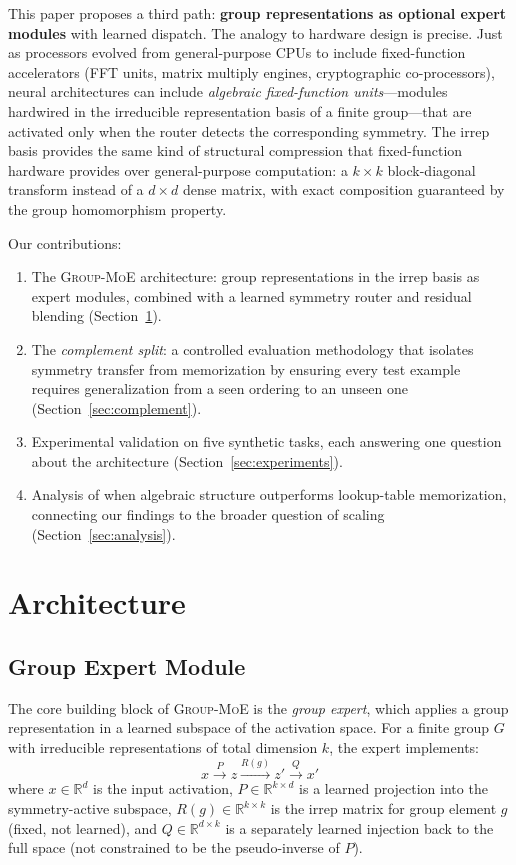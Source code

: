 \documentclass[10pt, letterpaper]{article}
\newcommand{\R}{\mathbb{R}}
\newcommand{\Rg}{R(g)}
\newcommand{\gmoe}{\textsc{Group-MoE}}
\begin{document}
This paper proposes a third path: \textbf{group representations as optional expert modules} with learned dispatch. The analogy to hardware design is precise. Just as processors evolved from general-purpose CPUs to include fixed-function accelerators (FFT units, matrix multiply engines, cryptographic co-processors), neural architectures can include \emph{algebraic fixed-function units}---modules hardwired in the irreducible representation basis of a finite group---that are activated only when the router detects the corresponding symmetry. The irrep basis provides the same kind of structural compression that fixed-function hardware provides over general-purpose computation: a $k \times k$ block-diagonal transform instead of a $d \times d$ dense matrix, with exact composition guaranteed by the group homomorphism property.

Our contributions:
\begin{enumerate}[leftmargin=*]
    \item The \gmoe{} architecture: group representations in the irrep basis as expert modules, combined with a learned symmetry router and residual blending (Section~\ref{sec:arch}).
    \item The \emph{complement split}: a controlled evaluation methodology that isolates symmetry transfer from memorization by ensuring every test example requires generalization from a seen ordering to an unseen one (Section~\ref{sec:complement}).
    \item Experimental validation on five synthetic tasks, each answering one question about the architecture (Section~\ref{sec:experiments}).
    \item Analysis of when algebraic structure outperforms lookup-table memorization, connecting our findings to the broader question of scaling (Section~\ref{sec:analysis}).
\end{enumerate}

\section{Architecture}
\label{sec:arch}

\subsection{Group Expert Module}

The core building block of \gmoe{} is the \emph{group expert}, which applies a group representation in a learned subspace of the activation space. For a finite group $G$ with irreducible representations of total dimension $k$, the expert implements:
\begin{equation}
    x \xrightarrow{P} z \xrightarrow{\Rg} z' \xrightarrow{Q} x'
    \label{eq:expert}
\end{equation}
where $x \in \R^d$ is the input activation, $P \in \R^{k \times d}$ is a learned projection into the symmetry-active subspace, $\Rg \in \R^{k \times k}$ is the irrep matrix for group element $g$ (fixed, not learned), and $Q \in \R^{d \times k}$ is a separately learned injection back to the full space (not constrained to be the pseudo-inverse of $P$).
\end{document}
